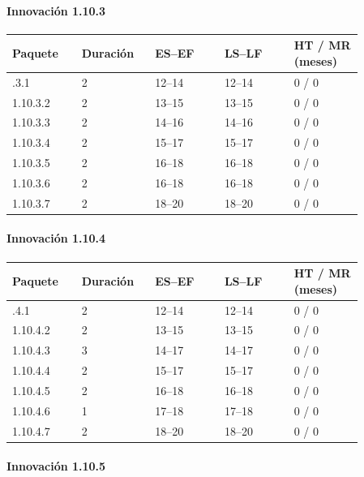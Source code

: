 \paragraph{Innovación 1.10.3}

\begin{longtable}{@{}p{0.171\linewidth}p{0.171\linewidth}p{0.171\linewidth}p{0.171\linewidth}p{0.171\linewidth}@{}}
\toprule
\textbf{Paquete} & \textbf{Duración} & \textbf{ES–EF} & \textbf{LS–LF} & \textbf{HT / MR (meses)} \\
\midrule
\endhead
\bottomrule
\endlastfoot
1.10.3.1 & 2 & 12–14 & 12–14 & 0 / 0 \\
1.10.3.2 & 2 & 13–15 & 13–15 & 0 / 0 \\
1.10.3.3 & 2 & 14–16 & 14–16 & 0 / 0 \\
1.10.3.4 & 2 & 15–17 & 15–17 & 0 / 0 \\
1.10.3.5 & 2 & 16–18 & 16–18 & 0 / 0 \\
1.10.3.6 & 2 & 16–18 & 16–18 & 0 / 0 \\
1.10.3.7 & 2 & 18–20 & 18–20 & 0 / 0 \\
\end{longtable}

\paragraph{Innovación 1.10.4}

\begin{longtable}{@{}p{0.171\linewidth}p{0.171\linewidth}p{0.171\linewidth}p{0.171\linewidth}p{0.171\linewidth}@{}}
\toprule
\textbf{Paquete} & \textbf{Duración} & \textbf{ES–EF} & \textbf{LS–LF} & \textbf{HT / MR (meses)} \\
\midrule
\endhead
\bottomrule
\endlastfoot
1.10.4.1 & 2 & 12–14 & 12–14 & 0 / 0 \\
1.10.4.2 & 2 & 13–15 & 13–15 & 0 / 0 \\
1.10.4.3 & 3 & 14–17 & 14–17 & 0 / 0 \\
1.10.4.4 & 2 & 15–17 & 15–17 & 0 / 0 \\
1.10.4.5 & 2 & 16–18 & 16–18 & 0 / 0 \\
1.10.4.6 & 1 & 17–18 & 17–18 & 0 / 0 \\
1.10.4.7 & 2 & 18–20 & 18–20 & 0 / 0 \\
\end{longtable}

\paragraph{Innovación 1.10.5}

